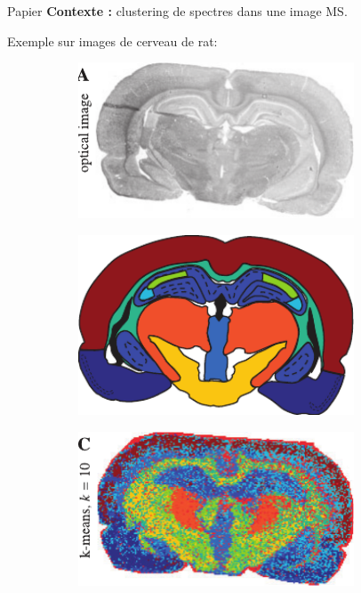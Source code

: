 \documentclass[10pt]{beamer}
\begin{document}
\begin{frame}{Papier}
  \textbf{Contexte :} clustering de spectres dans une image MS.

  Exemple sur images de cerveau de rat:
  \begin{figure}[ht]
    \centering
    \begin{subfigure}[t]{0.33\textwidth}
      \centering
      \includegraphics[width=0.9\textwidth]{fig/clustering_optical.pdf}
      \caption{}
      \label{subfig:clustering_optical.pdf}
    \end{subfigure}%
        \begin{subfigure}[t]{0.33\textwidth}
      \centering
      \includegraphics[width=0.9\textwidth]{fig/clustering_theoretical.pdf}
      \caption{}
      \label{subfig:clustering_th}
    \end{subfigure}%
        \begin{subfigure}[t]{0.33\textwidth}
      \centering
      \includegraphics[width=0.9\textwidth]{fig/clustering_kmeans.pdf}
      \caption{}
      \label{subfig:clustering_kmeans}
    \end{subfigure}%
  \end{figure}


\end{frame}
\end{document}
